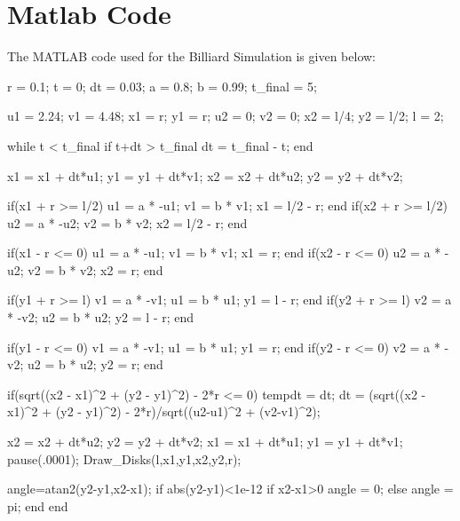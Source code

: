 \documentclass[12pt]{article}
\begin{document}
\clearpage
\appendix
\section{Matlab Code}\label{sec::appendix}
The MATLAB code used for the Billiard Simulation is given below:
\begin{verbatimtab}

r = 0.1;            %
t = 0;
dt = 0.03;          %
a = 0.8;            %
b = 0.99;           %
t_final = 5;

u1 = 2.24;
v1 = 4.48;
x1 = r;
y1 = r;
u2 = 0;
v2 = 0;
x2 = l/4;
y2 = l/2;
l = 2;


while t < t_final
    if t+dt > t_final
        dt = t_final - t;
    end
   
    
    x1 = x1 + dt*u1;
    y1 = y1 + dt*v1;
    x2 = x2 + dt*u2;
    y2 = y2 + dt*v2;    
    
    if(x1 + r >= l/2)
        u1 = a * -u1;
        v1 = b * v1;
        x1 = l/2 - r;
    end
    if(x2 + r >= l/2)
        u2 = a * -u2;
        v2 = b * v2;
        x2 = l/2 - r;
    end
    
    if(x1 - r <= 0)
        u1 = a * -u1;
        v1 = b * v1;
        x1 = r;
    end
    if(x2 - r <= 0)
        u2 = a * -u2;
        v2 = b * v2;
        x2 = r;
    end
    
    if(y1 + r >= l)
        v1 = a * -v1;
        u1 = b * u1;
        y1 = l - r;
    end
    if(y2 + r >= l)
        v2 = a * -v2;
        u2 = b * u2;
        y2 = l - r;
    end
    
    if(y1 - r <= 0)
        v1 = a * -v1;
        u1 = b * u1;
        y1 = r;
    end
    if(y2 - r <= 0)
        v2 = a * -v2;
        u2 = b * u2;
        y2 = r;
    end    
    
    if(sqrt((x2 - x1)^2 + (y2 - y1)^2) - 2*r <= 0)
        tempdt = dt;
        dt = (sqrt((x2 - x1)^2 + (y2 - y1)^2) - 2*r)/sqrt((u2-u1)^2 + (v2-v1)^2);
        
        x2 = x2 + dt*u2;
        y2 = y2 + dt*v2;
        x1 = x1 + dt*u1;
        y1 = y1 + dt*v1;
        pause(.0001);
        Draw_Disks(l,x1,y1,x2,y2,r);
        
        angle=atan2(y2-y1,x2-x1);
        if abs(y2-y1)<1e-12
            if x2-x1>0
                angle = 0;
            else
                angle = pi;
            end
        end       


\end{verbatimtab}
\end{document}
